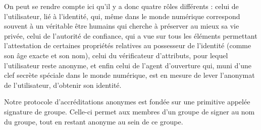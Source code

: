 
On peut se rendre compte ici qu’il y a donc quatre rôles différents : celui de l’utilisateur, lié à l’identité, qui, même dans le monde numérique correspond souvent à un véritable être humains qui cherche à préserver au mieux sa vie privée, celui de l’autorité de confiance, qui a vue sur tous les éléments permettant l’attestation de certaines propriétés relatives au possesseur de l’identité (comme son âge exacte et son nom), celui du vérificateur d’attributs, pour lequel l’utilisateur reste anonyme, et enfin celui de l’agent d’ouverture qui, muni d’une clef secrète spéciale dans le monde numérique, est en mesure de lever l’anonymat de l’utilisateur, d’obtenir son identité.\par
Notre protocole d’accréditations anonymes est fondée sur une primitive appelée signature de groupe. Celle-ci permet aux membres d’un groupe de signer au nom du groupe, tout en restant anonyme au sein de ce groupe.\par 





\label{sec:accreditations}



